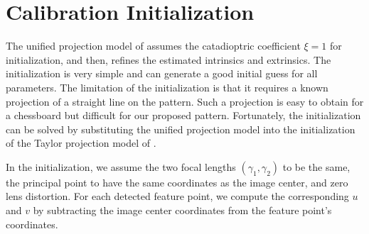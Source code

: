 \documentclass{report}
\begin{document}
\section{Calibration Initialization}

The unified projection model of \cite{mei2007single} assumes the catadioptric coefficient $\xi = 1$ for initialization, and then, refines the estimated intrinsics and extrinsics. The initialization is very simple and can generate a good initial guess for all parameters. The limitation of the initialization is that it requires a known projection of a straight line on the pattern. Such a projection is easy to obtain for a chessboard but difficult for our proposed pattern. Fortunately, the initialization can be solved by substituting the unified projection model into the initialization of the Taylor projection model of \cite{scaramuzza2006toolbox}.

In the initialization, we assume the two focal lengths $(\gamma_1, \gamma_2)$ to be the same, the principal point to have the same coordinates as the image center, and zero lens distortion. For each detected feature point, we compute the corresponding $u$ and $v$ by subtracting the image center coordinates from the feature point's coordinates.
\end{document}
